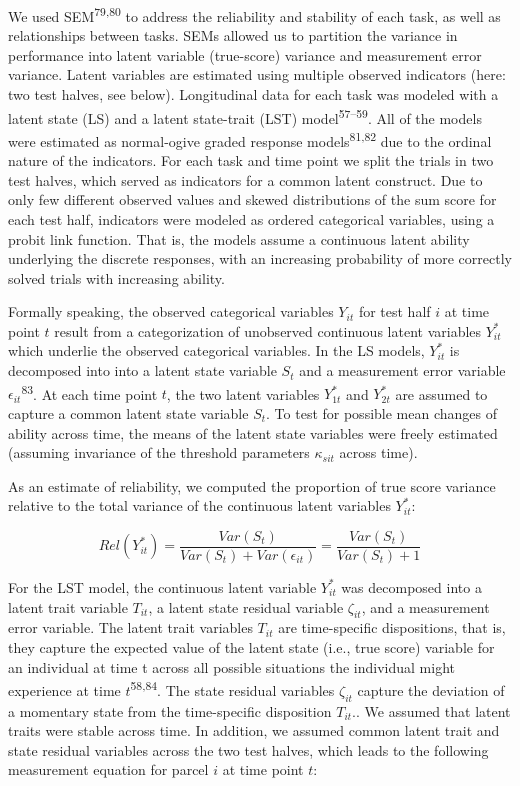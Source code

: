 \documentclass[
  man,floatsintext]{apa6}
\begin{document}
We used SEM\textsuperscript{79,80} to address the reliability and stability of each task, as well as relationships between tasks. SEMs allowed us to partition the variance in performance into latent variable (true-score) variance and measurement error variance. Latent variables are estimated using multiple observed indicators (here: two test halves, see below). Longitudinal data for each task was modeled with a latent state (LS) and a latent state-trait (LST) model\textsuperscript{57--59}. All of the models were estimated as normal-ogive graded response models\textsuperscript{81,82} due to the ordinal nature of the indicators. For each task and time point we split the trials in two test halves, which served as indicators for a common latent construct. Due to only few different observed values and skewed distributions of the sum score for each test half, indicators were modeled as ordered categorical variables, using a probit link function. That is, the models assume a continuous latent ability underlying the discrete responses, with an increasing probability of more correctly solved trials with increasing ability.

Formally speaking, the observed categorical variables \(Y_{it}\) for test half \(i\) at time point \(t\) result from a categorization of unobserved continuous latent variables \(Y^*_{it}\) which underlie the observed categorical variables. In the LS models, \(Y^*_{it}\) is decomposed into into a latent state variable \(S_t\) and a measurement error variable \(\epsilon_{it}\)\textsuperscript{83}. At each time point \(t\), the two latent variables \(Y^*_{1t}\) and \(Y^*_{2t}\) are assumed to capture a common latent state variable \(S_t\). To test for possible mean changes of ability across time, the means of the latent state variables were freely estimated (assuming invariance of the threshold parameters \(\kappa_{sit}\) across time).

As an estimate of reliability, we computed the proportion of true score variance relative to the total variance of the continuous latent variables \(Y^*_{it}\):

\begin{equation}
Rel(Y^*_{it})=\frac{Var(S_t)}{Var(S_t)+Var(\epsilon_{it})}=\frac{Var(S_t)}{Var(S_t)+1}
\end{equation}

For the LST model, the continuous latent variable \(Y^*_{it}\) was decomposed into a latent trait variable \(T_{it}\), a latent state residual variable \(\zeta_{it}\), and a measurement error variable. The latent trait variables \(T_{it}\) are time-specific dispositions, that is, they capture the expected value of the latent state (i.e., true score) variable for an individual at time t across all possible situations the individual might experience at time \(t\)\textsuperscript{58,84}. The state residual variables \(\zeta_{it}\) capture the deviation of a momentary state from the time-specific disposition \(T_{it}\).. We assumed that latent traits were stable across time. In addition, we assumed common latent trait and state residual variables across the two test halves, which leads to the following measurement equation for parcel \(i\) at time point \(t\):
\end{document}
